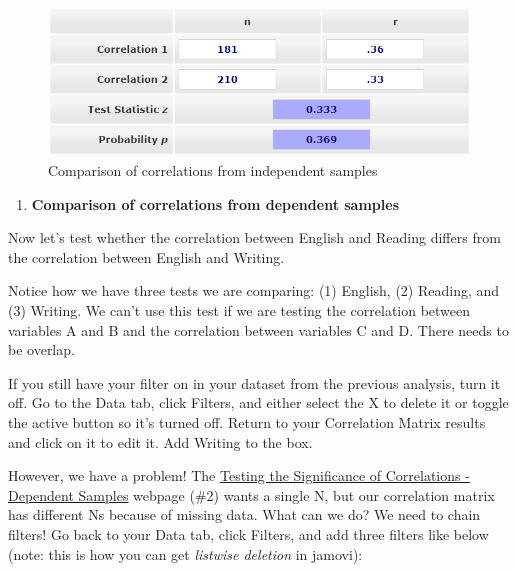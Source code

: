 \documentclass[
]{book}
\providecommand{\tightlist}{%
  \setlength{\itemsep}{0pt}\setlength{\parskip}{0pt}}
\begin{document}
\begin{figure}

{\centering \includegraphics[width=1\linewidth]{images/08-correlation/compare-correlations-independent} 

}

\caption{Comparison of correlations from independent samples}\label{fig:unnamed-chunk-10}
\end{figure}

\begin{enumerate}
\def\labelenumi{\arabic{enumi}.}
\setcounter{enumi}{1}
\tightlist
\item
  \textbf{Comparison of correlations from dependent samples}
\end{enumerate}

Now let's test whether the correlation between English and Reading differs from the correlation between English and Writing.

Notice how we have three tests we are comparing: (1) English, (2) Reading, and (3) Writing. We can't use this test if we are testing the correlation between variables A and B and the correlation between variables C and D. There needs to be overlap.

If you still have your filter on in your dataset from the previous analysis, turn it off. Go to the Data tab, click Filters, and either select the X to delete it or toggle the active button so it's turned off. Return to your Correlation Matrix results and click on it to edit it. Add Writing to the box.

However, we have a problem! The \href{https://www.psychometrica.de/correlation.html\#dependent}{Testing the Significance of Correlations - Dependent Samples} webpage (\#2) wants a single N, but our correlation matrix has different Ns because of missing data. What can we do? We need to chain filters! Go back to your Data tab, click Filters, and add three filters like below (note: this is how you can get \emph{listwise deletion} in jamovi):
\end{document}
